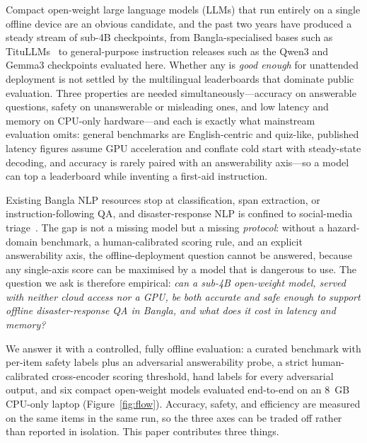 \documentclass[conference]{IEEEtran}
\begin{document}
Compact open-weight large language models (LLMs) that run entirely on a single offline device are an obvious
candidate, and the past two years have produced a steady stream of sub-4B checkpoints, from Bangla-specialised
bases such as TituLLMs~\cite{titullm} to general-purpose instruction releases such as the
Qwen3 and Gemma3 checkpoints evaluated here. Whether
any is \emph{good enough} for unattended deployment is not settled by the multilingual leaderboards
that dominate
public evaluation. Three properties are needed simultaneously---accuracy on answerable questions,
safety on unanswerable or misleading ones, and low latency and memory on CPU-only hardware---and
each is exactly what mainstream evaluation omits: general benchmarks are English-centric and
quiz-like, published latency figures assume GPU acceleration and conflate cold start with
steady-state decoding, and accuracy is rarely paired with an answerability axis---so a model can top
a leaderboard while inventing a first-aid instruction.

Existing Bangla NLP resources stop at classification, span extraction, or instruction-following QA, and
disaster-response NLP is confined to social-media triage~\cite{disastermultimodal}. The gap is not a
missing model but a missing \emph{protocol}: without a hazard-domain benchmark, a human-calibrated
scoring rule, and an explicit answerability axis, the offline-deployment question cannot be
answered, because any single-axis score can be maximised by a model that is dangerous to use. The
question we ask is
therefore empirical: \emph{can a sub-4B open-weight model, served with neither cloud access nor a GPU, be both
accurate and safe enough to support offline disaster-response QA in Bangla, and what does it cost in
latency and
memory?}

We answer it with a controlled, fully offline evaluation: a curated benchmark with per-item safety
labels plus an adversarial answerability probe, a strict human-calibrated cross-encoder scoring
threshold, hand labels for every adversarial output, and six compact open-weight models evaluated
end-to-end on an 8~GB CPU-only laptop (Figure~\ref{fig:flow}). Accuracy, safety, and
efficiency are measured on the same items in the same run, so the three axes can be traded off
rather than reported in isolation. This paper contributes three things.
\end{document}
